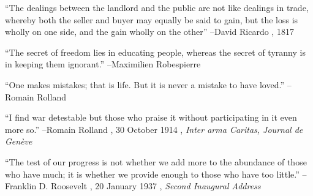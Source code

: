 \documentclass{article}%
\begin{document}
\begin{minipage}{\textwidth}%
\flushleft%
“The dealings between the landlord and the public are not like dealings in trade, whereby both the seller and buyer may equally be said to gain, but the loss is wholly on one side, and the gain wholly on the other”%
\linebreak%
\vspace{1mm}%
–David Ricardo%
, 1817%
\linebreak%
\vspace{1mm}%
\end{minipage}%
\linebreak%
\vspace{1mm}%
\begin{minipage}{\textwidth}%
\flushleft%
“The secret of freedom lies in educating people, whereas the secret of tyranny is in keeping them ignorant.”%
\linebreak%
\vspace{1mm}%
–Maximilien Robespierre%
\linebreak%
\vspace{1mm}%
\end{minipage}%
\linebreak%
\vspace{1mm}%
\begin{minipage}{\textwidth}%
\flushleft%
“One makes mistakes; that is life. But it is never a mistake to have loved.”%
\linebreak%
\vspace{1mm}%
–Romain Rolland%
\linebreak%
\vspace{1mm}%
\end{minipage}%
\linebreak%
\vspace{1mm}%
\begin{minipage}{\textwidth}%
\flushleft%
“I find war detestable but those who praise it without participating in it even more so.”%
\linebreak%
\vspace{1mm}%
–Romain Rolland%
, 30 October 1914%
, \textit{Inter arma Caritas, Journal de Genève}%
\linebreak%
\vspace{1mm}%
\end{minipage}%
\linebreak%
\vspace{1mm}%
\begin{minipage}{\textwidth}%
\flushleft%
“The test of our progress is not whether we add more to the abundance of those who have much; it is whether we provide enough to those who have too little.”%
\linebreak%
\vspace{1mm}%
–Franklin D. Roosevelt%
, 20 January 1937%
, \textit{Second Inaugural Address}%
\linebreak%
\vspace{1mm}%
\end{minipage}%
\end{document}
